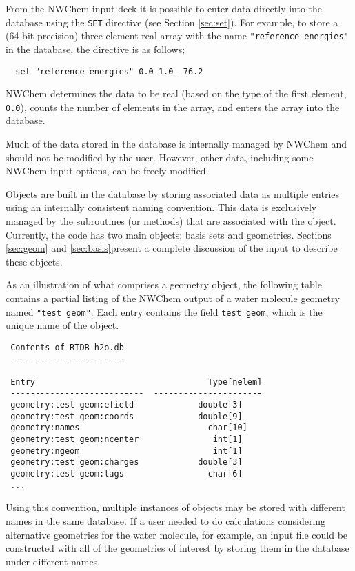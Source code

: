 \fussy

From the NWChem input deck it is possible to enter data directly into
the database using the \verb+SET+ directive (see Section
\ref{sec:set}).  For example, to store a (64-bit precision)
three-element real array with the name \verb+"reference energies"+ in
the database, the directive is as follows;
\begin{verbatim}
  set "reference energies" 0.0 1.0 -76.2
\end{verbatim}
NWChem determines the data to be real (based on the type of the first
element, \verb+0.0+), counts the number
of elements in the array, and enters the array into the database.

Much of the data stored in the database is internally managed by
NWChem and should not be modified by the user.  However, other data,
including some NWChem input options, can be freely modified.  

Objects are built in the database by storing associated data as
multiple entries using an internally consistent naming convention.
This data is exclusively managed by the subroutines (or methods) that
are associated with the object.  Currently, the code has two main
objects; basis sets and geometries.  Sections \ref{sec:geom} and
\ref{sec:basis}present a complete discussion of the input to describe
these objects.

As an illustration of what comprises a geometry object, the following
table contains a partial listing of the NWChem output of a water molecule
geometry named \verb+"test geom"+.  Each entry contains the field 
\verb+test geom+, which is the unique name of the object.

\begin{verbatim}
 Contents of RTDB h2o.db
 -----------------------

 Entry                                   Type[nelem]
 ---------------------------  ----------------------
 geometry:test geom:efield             double[3]    
 geometry:test geom:coords             double[9]    
 geometry:names                          char[10]   
 geometry:test geom:ncenter               int[1]    
 geometry:ngeom                           int[1]    
 geometry:test geom:charges            double[3]    
 geometry:test geom:tags                 char[6]
 ...
\end{verbatim}

Using this convention, multiple instances of objects may be stored with
different names in the same database.  If a user needed to do calculations 
considering alternative geometries
for the water molecule, for example, an input file could be constructed with 
all of the geometries of interest by storing them in the 
database under different names.  

